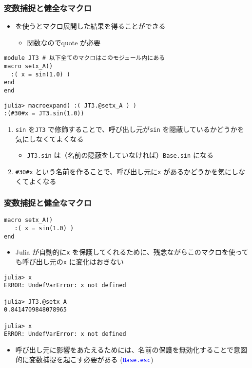 \begin{frame}[containsverbatim]
  \frametitle{変数捕捉と健全なマクロ}
\begin{itemize}
  \item {} を使うとマクロ展開した結果を得ることができる
    \begin{itemize}
      \item 関数なのでquote が必要
    \end{itemize}
\end{itemize}
\begin{lstlisting}
module JT3 # 以下全てのマクロはこのモジュール内にある
macro setx_A()
  :( x = sin(1.0) )
end
end
\end{lstlisting}

\begin{lstlisting}
julia> macroexpand( :( JT3.@setx_A ) )
:(#30#x = JT3.sin(1.0))
\end{lstlisting}

\begin{enumerate}
  \item \verb|sin| を\verb|JT3| で修飾することで、呼び出し元が\verb|sin| を隠蔽しているかどうかを気にしなくてよくなる
    \begin{itemize}
      \item \verb|JT3.sin| は（名前の隠蔽をしていなければ）\verb|Base.sin| になる
    \end{itemize}
  \item \verb|#30#x| という名前を作ることで、呼び出し元に\verb|x| があるかどうかを気にしなくてよくなる
\end{enumerate}

\end{frame}

\begin{frame}[containsverbatim]
\frametitle{変数捕捉と健全なマクロ}
\begin{lstlisting}
macro setx_A()
   :( x = sin(1.0) )
end
\end{lstlisting}
\begin{itemize}
  \item Julia が自動的に\verb|x| を保護してくれるために、残念ながらこのマクロを使っても呼び出し元の\verb|x| に変化はおきない
\end{itemize}
\begin{lstlisting}
julia> x
ERROR: UndefVarError: x not defined

julia> JT3.@setx_A
0.8414709848078965

julia> x
ERROR: UndefVarError: x not defined
\end{lstlisting}
\begin{itemize}
  \item 呼び出し元に影響をあたえるためには、名前の保護を無効化することで意図的に変数捕捉を起こす必要がある (\textcolor{blue}{\texttt{Base.esc}})
\end{itemize}
\end{frame}

